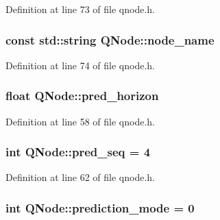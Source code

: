 Definition at line 73 of file qnode.\+h.

\subsubsection[{\texorpdfstring{node\+\_\+name}{node_name}}]{\setlength{\rightskip}{0pt plus 5cm}const std\+::string Q\+Node\+::node\+\_\+name\hspace{0.3cm}{\ttfamily [protected]}}\hypertarget{class_q_node_ae2a04cf101323be1e9b2be1e63a03b7f}{}\label{class_q_node_ae2a04cf101323be1e9b2be1e63a03b7f}


Definition at line 74 of file qnode.\+h.

\subsubsection[{\texorpdfstring{pred\+\_\+horizon}{pred_horizon}}]{\setlength{\rightskip}{0pt plus 5cm}float Q\+Node\+::pred\+\_\+horizon}\hypertarget{class_q_node_a3430f5db8c773c840b76794c82a9d58f}{}\label{class_q_node_a3430f5db8c773c840b76794c82a9d58f}


Definition at line 58 of file qnode.\+h.

\subsubsection[{\texorpdfstring{pred\+\_\+seq}{pred_seq}}]{\setlength{\rightskip}{0pt plus 5cm}int Q\+Node\+::pred\+\_\+seq = 4}\hypertarget{class_q_node_aed4571afa880dc86a88b229c6517bfa1}{}\label{class_q_node_aed4571afa880dc86a88b229c6517bfa1}


Definition at line 62 of file qnode.\+h.

\subsubsection[{\texorpdfstring{prediction\+\_\+mode}{prediction_mode}}]{\setlength{\rightskip}{0pt plus 5cm}int Q\+Node\+::prediction\+\_\+mode = 0}\hypertarget{class_q_node_a5d5139bf1420415b2e0c2b0e52db957e}{}\label{class_q_node_a5d5139bf1420415b2e0c2b0e52db957e}


